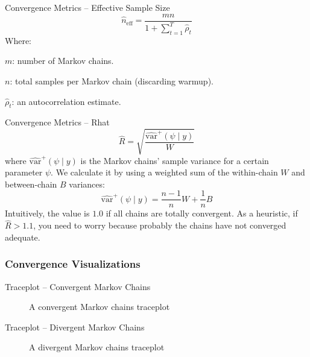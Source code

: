 \begin{frame}{Convergence Metrics -- Effective Sample Size \parencite{gelman2013bayesian}}
	$$\widehat{n}_{\text{eff}} = \frac{mn}{1 + \sum_{t=1}^T \widehat{\rho}_t}$$
	Where:
	\begin{vfilleditems}
		\item $m$: number of Markov chains.
		\item $n$: total samples per Markov chain (discarding warmup).
		\item $\widehat{\rho}_t$: an autocorrelation estimate.
	\end{vfilleditems}
\end{frame}

\begin{frame}{Convergence Metrics -- Rhat \parencite{gelman2013bayesian}}
	$$\widehat{R} = \sqrt{\frac{\widehat{\text{var}}^+(\psi \mid y)}{W}}$$
	where $\widehat{\text{var}}^+(\psi \mid y)$ is the Markov chains' sample variance
	for a certain parameter $\psi$.
	We calculate it by using a weighted sum of the within-chain $W$
	and between-chain $B$ variances:
	$$\widehat{\text{var}}^+(\psi \mid y) = \frac{n-1}{n} W + \frac{1}{n} B$$
	\vfill
	Intuitively, the value is $1.0$ if all chains are totally convergent.
	As a heuristic, if $\widehat{R} > 1.1$,
	you need to worry because probably the chains have not converged adequate.
\end{frame}

\subsubsection{Convergence Visualizations}
\begin{frame}{Traceplot -- Convergent Markov Chains}
	\begin{figure}
		\centering
		\resizebox{.4\linewidth}{!}{}
		\caption{A convergent Markov chains traceplot}
	\end{figure}
\end{frame}

\begin{frame}{Traceplot -- Divergent Markov Chains}
	\begin{figure}
		\centering
		\resizebox{.4\linewidth}{!}{}
		\caption{A divergent Markov chains traceplot}
	\end{figure}
\end{frame}

